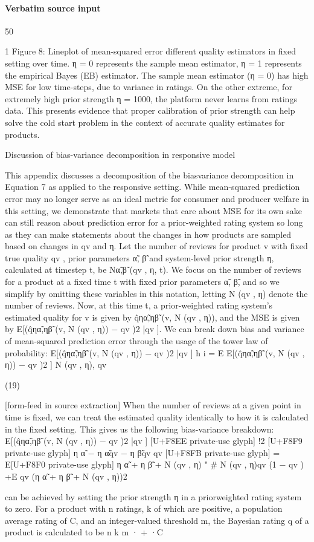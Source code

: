 \documentclass[10pt]{article}
\begin{document}
\paragraph{Verbatim source input}
\begin{ReviewVerbatim}
50

1
Figure 8: Lineplot of mean-squared
error different quality
estimators in fixed setting over time. η = 0 represents the
sample mean estimator, η = 1 represents the empirical
Bayes (EB) estimator. The sample mean estimator (η = 0)
has high MSE for low time-steps, due to variance in ratings. On the other extreme, for extremely high prior strength
η = 1000, the platform never learns from ratings data. This
presents evidence that proper calibration of prior strength
can help solve the cold start problem in the context of accurate quality estimates for products.

Discussion of bias-variance decomposition
in responsive model

This appendix discusses a decomposition of the biasvariance decomposition in Equation 7 as applied to the responsive setting. While mean-squared prediction error may
no longer serve as an ideal metric for consumer and producer welfare in this setting, we demonstrate that markets
that care about MSE for its own sake can still reason about
prediction error for a prior-weighted rating system so long as
they can make statements about the changes in how products
are sampled based on changes in qv and η.
Let the number of reviews for product v with fixed true
quality qv , prior parameters α̃, β̃ and system-level prior
strength η, calculated at timestep t, be Nα̃,β̃ (qv , η, t). We
focus on the number of reviews for a product at a fixed
time t with fixed prior parameters α̃, β̃, and so we simplify by omitting these variables in this notation, letting
N (qv , η) denote the number of reviews. Now, at this time
t, a prior-weighted rating system’s estimated quality for v
is given by q̂ηα̃,ηβ̃ (v, N (qv , η)), and the MSE is given by
E[(q̂ηα̃,ηβ̃ (v, N (qv , η)) − qv )2 |qv ]. We can break down bias
and variance of mean-squared prediction error through the
usage of the tower law of probability:
E[(q̂ηα̃,ηβ̃ (v, N (qv , η)) − qv )2 |qv ]
h
i
= E E[(q̂ηα̃,ηβ̃ (v, N (qv , η)) − qv )2 ] N (qv , η), qv

(19)


[form-feed in source extraction]
When the number of reviews at a given point in time is
fixed, we can treat the estimated quality identically to how it
is calculated in the fixed setting. This gives us the following
bias-variance breakdown:
E[(q̂ηα̃,ηβ̃ (v, N (qv , η)) − qv )2 |qv ]
[U+F8EE private-use glyph]
!2 [U+F8F9 private-use glyph]
η α̃ − η α̃qv − η β̃qv
qv [U+F8FB private-use glyph]
= E[U+F8F0 private-use glyph]
η α̃ + η β̃ + N (qv , η)
"
#
N (qv , η)qv (1 − qv )
+E
qv
(η α̃ + η β̃ + N (qv , η))2

can be achieved by setting the prior strength η in a priorweighted rating system to zero. For a product with n ratings, k of which are positive, a population average rating of
C, and an integer-valued threshold m, the Bayesian rating q
of a product is calculated to be
n
k
m
· +
·C
\end{ReviewVerbatim}
\end{document}
